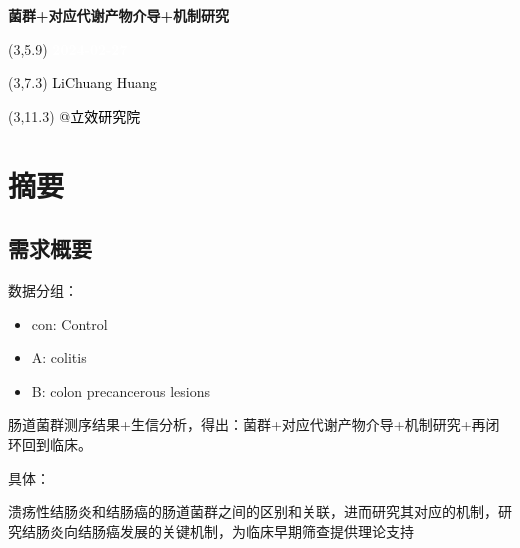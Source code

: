 \documentclass[
]{article}
\author{}
\date{\vspace{-2.5em}}
\providecommand{\tightlist}{%
  \setlength{\itemsep}{0pt}\setlength{\parskip}{0pt}}
\begin{document}
\begin{titlepage} 
\begin{center} \textbf{\Huge
菌群+对应代谢产物介导+机制研究} \vspace{4em}
\begin{textblock}{10}(3,5.9) \huge
\textbf{\textcolor{white}{2024-02-27}}
\end{textblock} \begin{textblock}{10}(3,7.3)
\Large \textcolor{black}{LiChuang Huang}
\end{textblock} \begin{textblock}{10}(3,11.3)
\Large \textcolor{black}{@立效研究院}
\end{textblock} \end{center} \end{titlepage}
\restoregeometry


\tableofcontents

\listoffigures

\listoftables

\newpage


\hypertarget{abstract}{%
\section{摘要}\label{abstract}}

\hypertarget{ux9700ux6c42ux6982ux8981}{%
\subsection{需求概要}\label{ux9700ux6c42ux6982ux8981}}

数据分组：

\begin{itemize}
\tightlist
\item
  con: Control
\item
  A: colitis
\item
  B: colon precancerous lesions
\end{itemize}

肠道菌群测序结果+生信分析，得出：菌群+对应代谢产物介导+机制研究+再闭环回到临床。

具体：

溃疡性结肠炎和结肠癌的肠道菌群之间的区别和关联，进而研究其对应的机制，研究结肠炎向结肠癌发展的关键机制，为临床早期筛查提供理论支持
\end{document}
